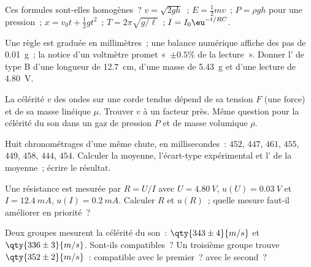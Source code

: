 \begin{exercise}[$\star$]\label{exo:b1:units-dimensions:3}
Ces formules sont-elles homogènes~? $v = \sqrt{2gh}$~;
$E = \tfrac12 m v$~; $P = \rho g h$ pour une pression~; $x = v_0 t +
\tfrac12 g t^2$~; $T = 2\pi\sqrt{g/\ell}$~; $I = I_0 \eu^{-t/RC}$.
\end{exercise}

\begin{exercise}[$\star$]\label{exo:b1:units-dimensions:4}
Une règle est graduée en millimètres~; une balance numérique affiche des
pas de \qty{0.01}{g}~; la notice d'un voltmètre promet «~$\pm 0.5\%$ de
la lecture~». Donner l' de type B d'une longueur de
\qty{12.7}{cm}, d'une masse de \qty{5.43}{g} et d'une lecture de
\qty{4.80}{V}.
\end{exercise}

\begin{exercise}[$\star\star$]\label{exo:b1:units-dimensions:5}
La célérité $v$ des ondes sur une corde tendue dépend de sa tension $F$
(une force) et de sa masse linéique $\mu$. Trouver $v$ à un facteur  près. Même question pour la célérité du son dans un gaz de
pression $P$ et de masse volumique $\rho$.
\end{exercise}

\begin{exercise}[$\star\star$]\label{exo:b1:units-dimensions:6}
Huit chronométrages d'une même chute, en millisecondes~: $452$, $447$,
$461$, $455$, $449$, $458$, $444$, $454$. Calculer la moyenne,
l'écart-type expérimental et l' de la moyenne~; écrire
le résultat.
\end{exercise}

\begin{exercise}[$\star\star$]\label{exo:b1:units-dimensions:7}
Une résistance est mesurée par $R = U/I$ avec $U = \qty{4.80}{V}$,
$u(U) = \qty{0.03}{V}$ et $I = \qty{12.4}{mA}$, $u(I) = \qty{0.2}{mA}$.
Calculer $R$ et $u(R)$~; quelle mesure faut-il améliorer en priorité~?
\end{exercise}

\begin{exercise}[$\star\star$]\label{exo:b1:units-dimensions:8}
Deux groupes mesurent la célérité du son~: $\qty{343\pm4}{m/s}$ et
$\qty{336\pm3}{m/s}$. Sont-ils compatibles~? Un troisième groupe trouve
$\qty{352\pm2}{m/s}$~: compatible avec le premier~? avec le second~?
\end{exercise}

